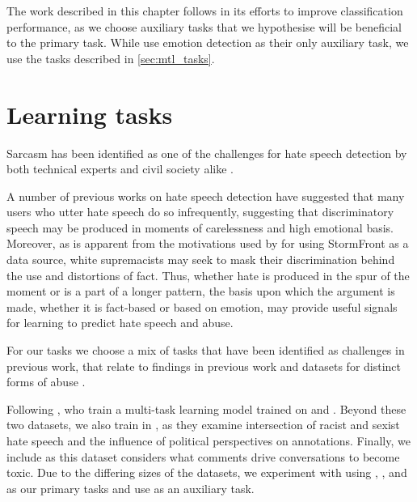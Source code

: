 The work described in this chapter follows \citet{Rajamanickam:2020} in its efforts to improve classification performance, as we choose auxiliary tasks that we hypothesise will be beneficial to the primary task. While \citet{Rajamanickam:2020} use emotion detection as their only auxiliary task, we use the tasks described in \autoref{sec:mtl_tasks}.

\section{Learning tasks}\label{sec:mtl_tasks}


Sarcasm has been identified as one of the challenges for hate speech detection by both technical experts and civil society alike \citep{Rottger:2021}.

A number of previous works on hate speech detection have suggested that many users who utter hate speech do so infrequently, suggesting that discriminatory speech may be produced in moments of carelessness and high emotional basis. Moreover, as is apparent from the motivations used by \citet{Garcia:2019} for using StormFront as a data source, white supremacists may seek to mask their discrimination behind the use and distortions of fact. Thus, whether hate is produced in the spur of the moment or is a part of a longer pattern, the basis upon which the argument is made, whether it is fact-based or based on emotion, may provide useful signals for learning to predict hate speech and abuse.

For our tasks we choose a mix of tasks that have been identified as challenges in previous work, that relate to findings in previous work \cite{Waseem-Hovy:2016,Davidson:2017,Schmidt:2017} and datasets for distinct forms of abuse \cite{Waseem:2016,Waseem-Hovy:2016,Davidson:2017,Wulczyn:2016}.

Following \citet{Waseem:2018}, who train a multi-task learning model trained on \citet{Waseem-Hovy:2016} and \citet{Davidson:2017}. Beyond these two datasets, we also train in \citet{Waseem:2016}, as they examine intersection of racist and sexist hate speech and the influence of political perspectives on annotations. Finally, we include \citet{Wulczyn:2016} as this dataset considers what comments drive conversations to become toxic. Due to the differing sizes of the datasets, we experiment with using \citet{Wulczyn:2016}, \citet{Davidson:2017}, and \citet{Waseem:2016} as our primary tasks and use \citet{Waseem-Hovy:2016} as an auxiliary task.


